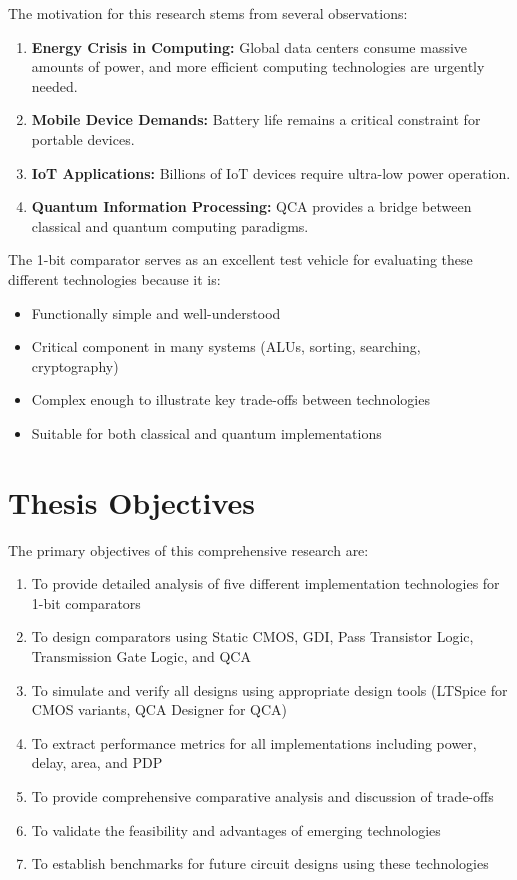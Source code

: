 \documentclass[12pt,a4paper,twoside]{report}
\begin{document}
The motivation for this research stems from several observations:

\begin{enumerate}
    \item \textbf{Energy Crisis in Computing:} Global data centers consume massive amounts of power, and more efficient computing technologies are urgently needed.
    \item \textbf{Mobile Device Demands:} Battery life remains a critical constraint for portable devices.
    \item \textbf{IoT Applications:} Billions of IoT devices require ultra-low power operation.
    \item \textbf{Quantum Information Processing:} QCA provides a bridge between classical and quantum computing paradigms.
\end{enumerate}

The 1-bit comparator serves as an excellent test vehicle for evaluating these different technologies because it is:
\begin{itemize}
    \item Functionally simple and well-understood
    \item Critical component in many systems (ALUs, sorting, searching, cryptography)
    \item Complex enough to illustrate key trade-offs between technologies
    \item Suitable for both classical and quantum implementations
\end{itemize}

\section{Thesis Objectives}

The primary objectives of this comprehensive research are:

\begin{enumerate}
    \item To provide detailed analysis of five different implementation technologies for 1-bit comparators
    \item To design comparators using Static CMOS, GDI, Pass Transistor Logic, Transmission Gate Logic, and QCA
    \item To simulate and verify all designs using appropriate design tools (LTSpice for CMOS variants, QCA Designer for QCA)
    \item To extract performance metrics for all implementations including power, delay, area, and PDP
    \item To provide comprehensive comparative analysis and discussion of trade-offs
    \item To validate the feasibility and advantages of emerging technologies
    \item To establish benchmarks for future circuit designs using these technologies
\end{enumerate}
\end{document}
